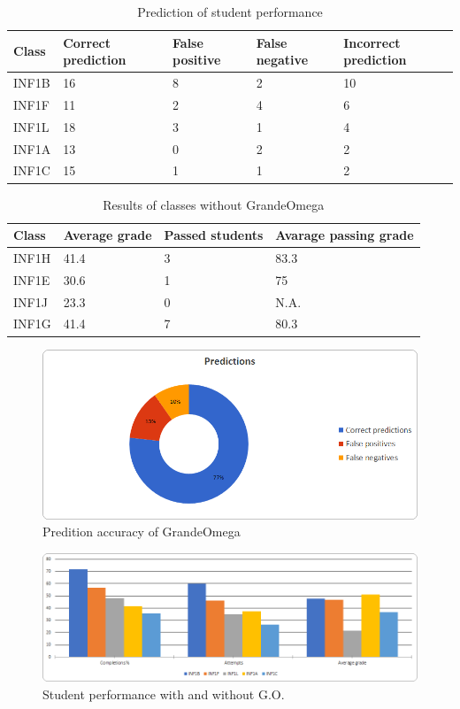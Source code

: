 \begin{table}
	\begin{tabular}{|p{}|p{}|p{}|p{}|p{}|}
		\hline
		\textbf{Class} & \textbf{Correct prediction} & \textbf{False positive} & \textbf{False negative} & \textbf{Incorrect prediction} \\
		\hline
		INF1B & 16 & 8 & 2 & 10 \\
		\hline
		INF1F & 11 & 2 & 4 & 6 \\
		\hline
		INF1L & 18 & 3 & 1 & 4 \\
		\hline
		INF1A & 13 & 0 & 2 & 2 \\
		\hline
		INF1C & 15 & 1 & 1 & 2 \\
		\hline
	\end{tabular}
	\caption{Prediction of student performance}
	\label{tab:prediction}
\end{table}

\begin{table}
	\begin{tabular}{|p{}|p{}|p{}|p{}|}
		\hline
		\textbf{Class} & \textbf{Average grade} & \textbf{Passed students} & \textbf{Avarage passing grade} \\
		\hline
		INF1H & 41.4 & 3 & 83.3 \\
		\hline
		INF1E & 30.6 & 1 & 75 \\
		\hline
		INF1J & 23.3 & 0 & N.A. \\
		\hline
		INF1G & 41.4 & 7 & 80.3 \\
		\hline
	\end{tabular}
	\caption{Results of classes without GrandeOmega}
	\label{tab:performance_no_go}
\end{table}

\begin{figure}
	\includegraphics[width = \textwidth]{Figures/prediction}
	\caption{Predition accuracy of GrandeOmega}
	\label{fig:prediction}
\end{figure}

\begin{figure}
	\includegraphics[width = \textwidth]{Figures/bar_chart}
	\caption{Student performance with and without G.O.}
	\label{fig:bar_chart}
\end{figure}